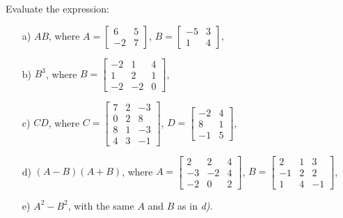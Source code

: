 \newpage
\begin{problem}[2 points]
    Evaluate the expression:

    \begin{enumerate}
        \item[a) ] $AB$, where $A=\begin{bmatrix}
        6&5\\-2&7  \end{bmatrix}$, $B=\begin{bmatrix}
        -5&3\\1&4   \end{bmatrix}$,

        \item[b) ] $B^3$, where $B=\begin{bmatrix}
        -2&1&4\\1&2&1\\-2&-2&0   \end{bmatrix}$,

        \item[c) ] $CD$, where $C=\begin{bmatrix}
        7&2&-3\\0&2&8\\8&1&-3\\4&3&-1   \end{bmatrix}$, $D=\begin{bmatrix}
            -2&4\\8&1\\-1&5
        \end{bmatrix}$,
        
        \item[d) ] $(A-B)(A+B)$, where $A=\begin{bmatrix}
        2&2&4\\-3&-2&4\\-2&0&2   \end{bmatrix}$, $B=\begin{bmatrix}
        2&1&3\\-1&2&2\\1&4&-1   \end{bmatrix}$,
        
        \item[e) ] $A^2 - B^2$, with the same $A$ and $B$ as in \textit{d)}.
    \end{enumerate}
\end{problem}

